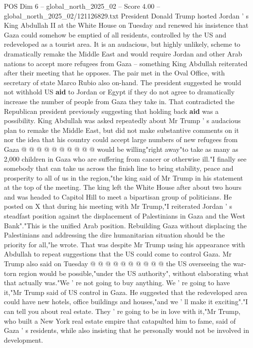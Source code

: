 \begin{textsample}{POS Dim 6 – global\_north\_2025\_02 – Score 4.00 – global\_north\_2025\_02/121126829.txt}  \label{ex:f6_pos_365}
President Donald Trump hosted Jordan ' s King Abdullah II at the White House on Tuesday and renewed his insistence that Gaza could somehow be emptied of all residents, controlled by the US and redeveloped as a tourist area.
It is an audacious, but highly unlikely, scheme to dramatically remake the Middle East and would require Jordan and other Arab nations to accept more refugees from Gaza -- something King Abdullah reiterated after their meeting that he opposes.
The pair met in the Oval Office, with secretary of state Marco Rubio also on-hand.
The president suggested he would not withhold US \textbf{aid} to Jordan or Egypt if they do not agree to dramatically increase the number of people from Gaza they take in.
That contradicted the Republican president previously suggesting that holding back \textbf{aid} was a possibility.
King Abdullah was asked repeatedly about Mr Trump ' s audacious plan to remake the Middle East, but did not make substantive comments on it nor the idea that his country could accept large numbers of new refugees from Gaza @ @ @ @ @ @ @ @ @ @ would be willing"right away"to take as many as 2,000 children in Gaza who are suffering from cancer or otherwise ill."I finally see somebody that can take us across the finish line to bring stability, peace and prosperity to all of us in the region,"the king said of Mr Trump in his statement at the top of the meeting.
The king left the White House after about two hours and was headed to Capitol Hill to meet a bipartisan group of politicians.
He posted on X that during his meeting with Mr Trump,"I reiterated Jordan ' s steadfast position against the displacement of Palestinians in Gaza and the West Bank"."This is the unified Arab position.
Rebuilding Gaza without displacing the Palestinians and addressing the dire humanitarian situation should be the priority for all,"he wrote.
That was despite Mr Trump using his appearance with Abdullah to repeat suggestions that the US could come to control Gaza.
Mr Trump also said on Tuesday @ @ @ @ @ @ @ @ @ @ the US overseeing the war-torn region would be possible,"under the US authority", without elaborating what that actually was."We ' re not going to buy anything.
We ' re going to have it,"Mr Trump said of US control in Gaza.
He suggested that the redeveloped area could have new hotels, office buildings and houses,"and we ' ll make it exciting"."I can tell you about real estate.
They ' re going to be in love with it,"Mr Trump, who built a New York real estate empire that catapulted him to fame, said of Gaza ' s residents, while also insisting that he personally would not be involved in development.

\end{textsample}
